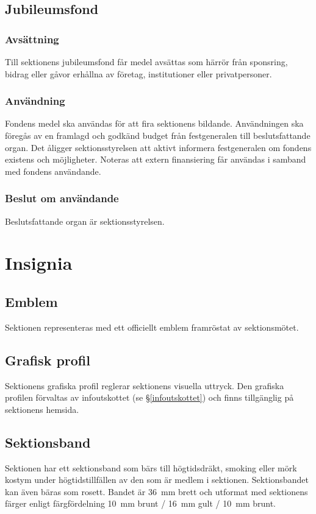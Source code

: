 \documentclass{datateknologsektionen-document}
\begin{document}
\subsection{Jubileumsfond}
\subsubsection{Avsättning}
Till sektionens jubileumsfond får medel avsättas som härrör från sponsring, bidrag
eller gåvor erhållna av företag, institutioner eller privatpersoner.

\subsubsection{Användning}
Fondens medel ska användas för att fira sektionens bildande. Användningen ska föregås
av en framlagd och godkänd budget från festgeneralen till beslutsfattande organ. Det
åligger sektionsstyrelsen att aktivt informera festgeneralen om fondens existens och
möjligheter. Noteras att extern finansiering får användas i samband med fondens användande.

\subsubsection{Beslut om användande}
Beslutsfattande organ är sektionsstyrelsen.

\section{Insignia}
\subsection{Emblem}
Sektionen representeras med ett officiellt emblem framröstat av sektionsmötet.

\subsection{Grafisk profil}
Sektionens grafiska profil reglerar sektionens visuella uttryck. Den grafiska
profilen förvaltas av infoutskottet (se \S \ref{infoutskottet}) och finns tillgänglig på sektionens hemsida.

\subsection{Sektionsband}
Sektionen har ett sektionsband som bärs till högtidsdräkt, smoking eller mörk kostym
under högtidstillfällen av den som är medlem i sektionen. Sektionsbandet kan även
bäras som rosett. Bandet är 36~mm brett och utformat med sektionens färger enligt
färgfördelning 10~mm brunt / 16~mm gult / 10~mm brunt.
\end{document}
